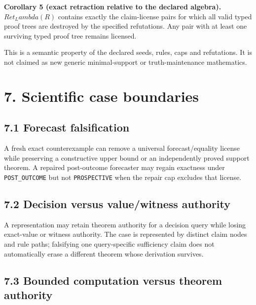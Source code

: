 \documentclass[11pt]{article}
\begin{document}
\textbf{Corollary 5 (exact retraction relative to the declared
algebra).} \(Ret_Lambda(R)\) contains exactly the claim-license pairs
for which all valid typed proof trees are destroyed by the specified
refutations. Any pair with at least one surviving typed proof tree
remains licensed.

This is a semantic property of the declared seeds, rules, caps and
refutations. It is not claimed as new generic minimal-support or
truth-maintenance mathematics.

\hypertarget{scientific-case-boundaries}{%
\section{7. Scientific case
boundaries}\label{scientific-case-boundaries}}

\hypertarget{forecast-falsification}{%
\subsection{7.1 Forecast falsification}\label{forecast-falsification}}

A fresh exact counterexample can remove a universal forecast/equality
license while preserving a constructive upper bound or an independently
proved support theorem. A repaired post-outcome forecaster may regain
exactness under \texttt{POST\_OUTCOME} but not \texttt{PROSPECTIVE} when
the repair cap excludes that license.

\hypertarget{decision-versus-valuewitness-authority}{%
\subsection{7.2 Decision versus value/witness
authority}\label{decision-versus-valuewitness-authority}}

A representation may retain theorem authority for a decision query while
losing exact-value or witness authority. The case is represented by
distinct claim nodes and rule paths; falsifying one query-specific
sufficiency claim does not automatically erase a different theorem whose
derivation survives.

\hypertarget{bounded-computation-versus-theorem-authority}{%
\subsection{7.3 Bounded computation versus theorem
authority}\label{bounded-computation-versus-theorem-authority}}
\end{document}
